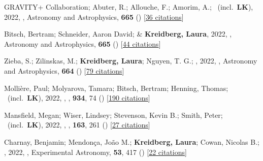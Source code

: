 \item[{\color{numcolor}\scriptsize69}] GRAVITY+ Collaboration; Abuter, R.; Allouche, F.; Amorim, A.; \etal\ (incl.\ \textbf{LK}), 2022, , Astronomy and Astrophysics, \textbf{665} () [\href{https://ui.adsabs.harvard.edu/abs/2022A&A...665A..75G}{36 citations}]

\item[{\color{numcolor}\scriptsize68}] Bitsch, Bertram; Schneider, Aaron David; \& \textbf{Kreidberg, Laura}, 2022, , Astronomy and Astrophysics, \textbf{665} () [\href{https://ui.adsabs.harvard.edu/abs/2022A&A...665A.138B}{44 citations}]

\item[{\color{numcolor}\scriptsize67}] Zieba, S.; Zilinskas, M.; \textbf{Kreidberg, Laura}; Nguyen, T. G.; \etal, 2022, , Astronomy and Astrophysics, \textbf{664} () [\href{https://ui.adsabs.harvard.edu/abs/2022A&A...664A..79Z}{79 citations}]

\item[{\color{numcolor}\scriptsize66}] Molli{\`e}re, Paul; Molyarova, Tamara; Bitsch, Bertram; Henning, Thomas; \etal\ (incl.\ \textbf{LK}), 2022, , \apj, \textbf{934}, 74 () [\href{https://ui.adsabs.harvard.edu/abs/2022ApJ...934...74M}{190 citations}]

\item[{\color{numcolor}\scriptsize65}] Mansfield, Megan; Wiser, Lindsey; Stevenson, Kevin B.; Smith, Peter; \etal\ (incl.\ \textbf{LK}), 2022, , \aj, \textbf{163}, 261 () [\href{https://ui.adsabs.harvard.edu/abs/2022AJ....163..261M}{27 citations}]

\item[{\color{numcolor}\scriptsize64}] Charnay, Benjamin; Mendon{\c{c}}a, Jo{\~a}o M.; \textbf{Kreidberg, Laura}; Cowan, Nicolas B.; \etal, 2022, , Experimental Astronomy, \textbf{53}, 417 () [\href{https://ui.adsabs.harvard.edu/abs/2022ExA....53..417C}{22 citations}]

